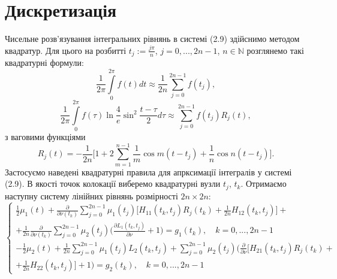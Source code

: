 \documentclass[a4 paper,12pt,ukrainian]{report}
\begin{document}
\section{Дискретизація}
\hspace*{\parindent}Чисельне розв'язування інтегральних рівнянь в системі (2.9) здійснимо методом квадратур. Для цього на розбитті $t_{j}:=\frac{j\pi}{n}$, $j=0,...,2n-1$, $n\in\mathbb{N}$ розглянемо такі квадратурні формули:
\begin{equation*}
\displaystyle
\frac{1}{2\pi}\int\limits_{0}^{2\pi}f(t)dt\approx
\frac{1}{2n}\sum\limits_{j=0}^{2n-1}f(t_{j}),
\end{equation*}
\begin{equation*}
\displaystyle
\frac{1}{2\pi}\int\limits_{0}^{2\pi}f(\tau)\ln{\frac{4}{e}\sin^2\frac{t-\tau}{2}}d\tau\approx\sum\limits_{j=0}^{2n-1}f(t_{j})R_{j}(t),
\end{equation*}
з ваговими функціями
\begin{equation*}
\displaystyle
R_{j}(t) = -\frac{1}{2n}\Big[1+2\sum\limits_{m=1}^{n-1}{\frac{1}{m}\cos{m(t-t_{j})}} + \frac{1}{n}\cos{n(t-t_{j})}\Big].
\end{equation*}
\hspace*{\parindent}Застосуємо наведені квадратурні правила для апрксимації інтегралів у системі (2.9). В якості точок колокації виберемо квадратурні вузли $t_{j}$, $t_{k}$. Отримаємо наступну систему лінійних рівнянь розмірності $2n\times 2n$:
\begin{equation}
\left\{
\begin{array}{c}
\displaystyle
\frac{1}{2}\mu_1(t) + \frac{\partial}{\partial \nu(t_k)}\sum\limits_{j=0}^{2n-1} \mu_1(t_j)\Big[H_{11}(t_k,t_j)R_j(t_k)+\frac{1}{2n}H_{12}(t_k,t_j)\Big]+\\ + \frac{1}{2n}\frac{\partial}{\partial \nu(t_k)}\sum\limits_{j=0}^{2n-1} \mu_2(t_j)\bigg(\frac{\partial L_1(t_k,t_j)}{\partial \nu} + 1\bigg)
\displaystyle
= g_1(t_k), \quad k=0,...,2n-1\\
\displaystyle
-\frac{1}{2}\mu_2(t) + \frac{1}{2n}\sum\limits_{j=0}^{2n-1} \mu_1(t_j)L_2(t_k,t_j)+\sum\limits_{j=0}^{2n-1} \mu_2(t_j)\bigg(\frac{\partial}{\partial \nu}\Big[H_{21}(t_k,t_j)R_j(t_k)+\\+\frac{1}{2n}H_{22}(t_k,t_j)\Big] + 1 \bigg)
\displaystyle
=g_2(t_k), \quad k=0,...,2n-1
\end{array}
\right.
\end{equation}
\end{document}
